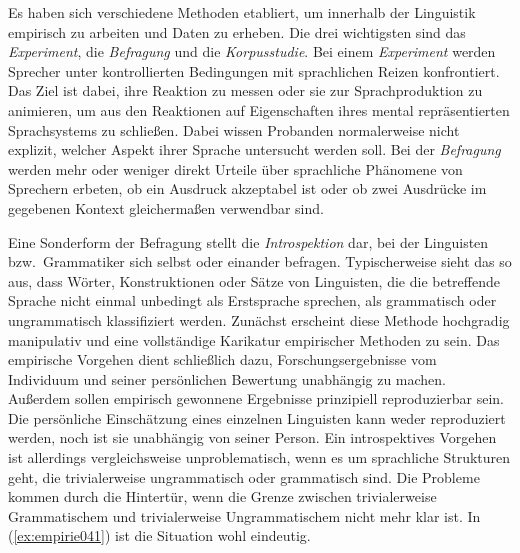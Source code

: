 Es haben sich verschiedene Methoden etabliert, um innerhalb der Linguistik empirisch zu arbeiten und Daten zu erheben.
Die drei wichtigsten sind das \textit{Experiment}, die \textit{Befragung} und die \textit{Korpusstudie}.
Bei einem \textit{Experiment} werden Sprecher unter kontrollierten Bedingungen mit sprachlichen Reizen konfrontiert.
Das Ziel ist dabei, ihre Reaktion zu messen oder sie zur Sprachproduktion zu animieren, um aus den Reaktionen auf Eigenschaften ihres mental repräsentierten Sprachsystems zu schließen.
Dabei wissen Probanden normalerweise nicht explizit, welcher Aspekt ihrer Sprache untersucht werden soll.
Bei der \textit{Befragung} werden mehr oder weniger direkt Urteile über sprachliche Phänomene von Sprechern erbeten, \zB ob ein Ausdruck akzeptabel ist oder ob zwei Ausdrücke im gegebenen Kontext gleichermaßen verwendbar sind.

Eine Sonderform der Befragung stellt die \textit{Introspektion} dar, bei der Linguisten bzw.\ Grammatiker sich selbst oder einander befragen.
Typischerweise sieht das so aus, dass Wörter, Konstruktionen oder Sätze von Linguisten, die die betreffende Sprache nicht einmal unbedingt als Erstsprache sprechen, als grammatisch oder ungrammatisch klassifiziert werden.
Zunächst erscheint diese Methode hochgradig manipulativ und eine vollständige Karikatur empirischer Methoden zu sein.
Das empirische Vorgehen dient schließlich dazu, Forschungsergebnisse vom Individuum und seiner persönlichen Bewertung unabhängig zu machen.
Außerdem sollen empirisch gewonnene Ergebnisse prinzipiell reproduzierbar sein.
Die persönliche Einschätzung eines einzelnen Linguisten kann weder reproduziert werden, noch ist sie unabhängig von seiner Person.
Ein introspektives Vorgehen ist allerdings vergleichsweise unproblematisch, wenn es um sprachliche Strukturen geht, die trivialerweise ungrammatisch oder grammatisch sind.
Die Probleme kommen durch die Hintertür, wenn die Grenze zwischen trivialerweise Grammatischem und trivialerweise Ungrammatischem nicht mehr klar ist.
In (\ref{ex:empirie041}) ist die Situation wohl eindeutig.

\begin{exe}
  \ex\label{ex:empirie041}
  \begin{xlist}
  \end{xlist}
\end{exe}

